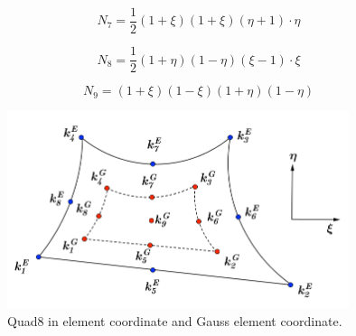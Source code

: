 \begin{equation}
N_7 = \frac{1}{2} \left(1 + \xi \right) \left( 1 + \xi \right)  \left( \eta + 1\right) \cdot\eta
\end{equation}

\begin{equation}
N_8 = \frac{1}{2} \left(1 + \eta \right) \left( 1 - \eta \right)  \left( \xi - 1\right) \cdot\xi
\end{equation}

\begin{equation}
N_9 = \left(1 + \xi \right) \left( 1 - \xi \right)  \left( 1 + \eta \right) \left(1 - \eta \right)
\end{equation}



\begin{figure}[h]
	\begin{center}
		\includegraphics[width=10cm,clip]{Quad8_1.pdf}			
		\caption{Quad8 in element coordinate and Gauss element coordinate.} \label{fig: Quad8_1}
	\end{center} 
\end{figure}

